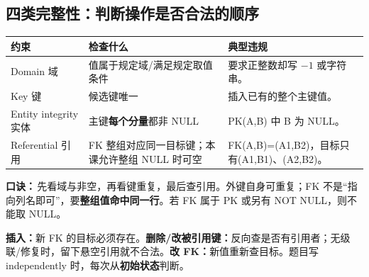 \documentclass[11pt,a4paper]{article}
\begin{document}
\subsection{四类完整性：判断操作是否合法的顺序}
\begin{tabularx}{\linewidth}{@{}lXX@{}}
\toprule 约束 & 检查什么 & 典型违规 \\
\midrule
Domain 域 & 值属于规定域/满足规定取值条件 & 要求正整数却写 $-1$ 或字符串。\\
Key 键 & 候选键唯一 & 插入已有的整个主键值。\\
Entity integrity 实体 & 主键\textbf{每个分量}都非 NULL & PK(A,B) 中 B 为 NULL。\\
Referential 引用 & FK 整组对应同一目标键；本课允许整组 NULL 时可空 & FK(A,B)=(A1,B2)，目标只有(A1,B1)、(A2,B2)。\\
\bottomrule
\end{tabularx}
\textbf{口诀：}\,先看域与非空，再看键重复，最后查引用。外键自身可重复；FK 不是“指向列名即可”，要\textbf{整组值命中同一行}。若 FK 属于 PK 或另有 NOT NULL，则不能取 NULL。\par
\textbf{插入：}新 FK 的目标必须存在。\textbf{删除/改被引用键：}反向查是否有引用者；无级联/修复时，留下悬空引用就不合法。\textbf{改 FK：}新值重新查目标。题目写 independently 时，每次从\textbf{初始状态}判断。
\end{document}
